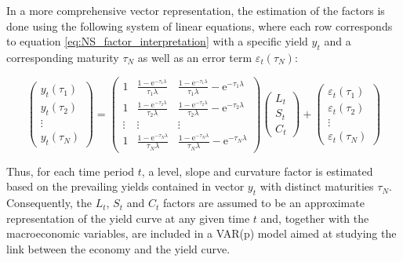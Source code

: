 In a more comprehensive vector representation, the estimation of the factors is done using the following system of linear equations, where each row corresponds to equation \ref{eq:NS_factor_interpretation} with a specific yield $y_{t}$ and a corresponding maturity $\tau_{N}$ as well as an error term $\varepsilon_{t}(\tau_{N})$:

\begin{equation}
\left(\begin{array}{c}
y_t\left(\tau_1\right) \\
y_t\left(\tau_2\right) \\
\vdots \\
y_t\left(\tau_N\right)
\end{array}\right)=\left(\begin{array}{ccc}
1 & \frac{1-\mathrm{e}^{-\tau_1 \lambda}}{\tau_1 \lambda} & \frac{1-\mathrm{e}^{-\tau_1 \lambda}}{\tau_1 \lambda}-\mathrm{e}^{-\tau_1 \lambda} \\
1 & \frac{1-\mathrm{e}^{-\tau_2 \lambda}}{\tau_2 \lambda} & \frac{1-\mathrm{e}^{-\tau_2 \lambda}}{\tau_2 \lambda}-\mathrm{e}^{-\tau_2 \lambda} \\
\vdots & \vdots & \vdots \\
1 & \frac{1-\mathrm{e}^{-\tau_N \lambda}}{\tau_N \lambda} & \frac{1-\mathrm{e}^{-\tau_N \lambda}}{\tau_N \lambda}-\mathrm{e}^{-\tau_N \lambda}
\end{array}\right)\left(\begin{array}{c}
L_t \\
S_t \\
C_t
\end{array}\right)+\left(\begin{array}{c}
\varepsilon_t\left(\tau_1\right) \\
\varepsilon_t\left(\tau_2\right) \\
\vdots \\
\varepsilon_t\left(\tau_N\right)
\end{array}\right)
\end{equation}

Thus, for each time period $t$, a level, slope and curvature factor is estimated based on the prevailing yields contained in vector $y_{t}$ with distinct maturities $\tau_{N}$. 
Consequently, the $L_{t}$, $S_{t}$ and $C_{t}$ factors are assumed to be an approximate representation of the yield curve at any given time $t$ and, together with the macroeconomic variables, are included in a VAR(p) model aimed at studying the link between the economy and the yield curve. 




